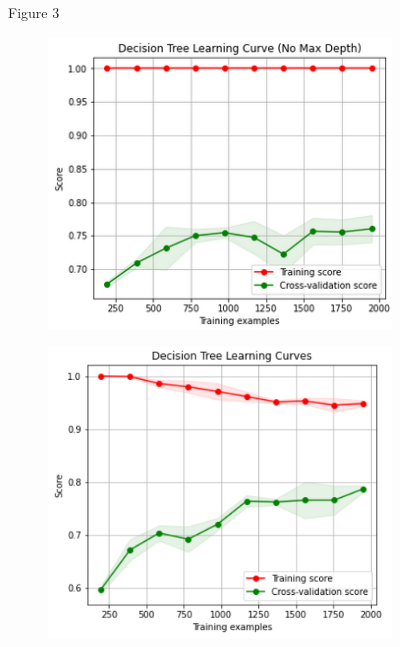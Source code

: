 \documentclass{article}
\begin{document}
\begin{figure}
\centering
Figure 3
\begin{subfigure}{.5\textwidth}
\centering
\includegraphics[width=\linewidth]{poland_decision_learning_curve_without_max_depth.png}

\end{subfigure}%
\begin{subfigure}{.5\textwidth}
\centering
\includegraphics[width=\linewidth]{poland_decision_learning_curve_with_max_depth.png}

\end{subfigure}
\label{fig:test}
\end{figure}
\end{document}
